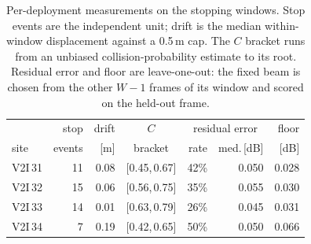 \begin{table}[t]
\centering
\setlength{\tabcolsep}{2.6pt}
\renewcommand{\arraystretch}{1.05}
\footnotesize
\begin{tabular}{lrrcrrr}
\hline
& stop & drift & $C$ & \multicolumn{2}{c}{residual error} & floor\\
site & events & [m] & bracket & rate & med.\,[dB] & [dB]\\
\hline
V2I\,31 & 11 & 0.08 & [0.45,\,0.67] & 42\% & 0.050 & 0.028\\
V2I\,32 & 15 & 0.06 & [0.56,\,0.75] & 35\% & 0.055 & 0.030\\
V2I\,33 & 14 & 0.01 & [0.63,\,0.79] & 26\% & 0.045 & 0.031\\
V2I\,34 & 7 & 0.19 & [0.42,\,0.65] & 50\% & 0.050 & 0.066\\
\hline
\end{tabular}
\caption{Per-deployment measurements on the stopping windows. Stop events are the independent unit; drift is the median within-window displacement against a 0.5\,m cap. The $C$ bracket runs from an unbiased collision-probability estimate to its root. Residual error and floor are leave-one-out: the fixed beam is chosen from the other $W-1$ frames of its window and scored on the held-out frame.}
\label{tab:deployments}
\end{table}
